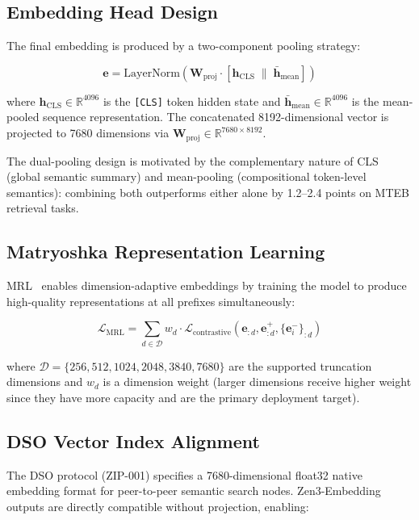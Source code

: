 \documentclass[11pt,a4paper]{article}
\begin{document}
\subsection{Embedding Head Design}

The final embedding is produced by a two-component pooling strategy:

\begin{equation}
\mathbf{e} = \text{LayerNorm}\left(\mathbf{W}_{\text{proj}} \cdot [\mathbf{h}_{\text{CLS}} \;\|\; \bar{\mathbf{h}}_{\text{mean}}]\right)
\end{equation}

where $\mathbf{h}_{\text{CLS}} \in \mathbb{R}^{4096}$ is the \texttt{[CLS]} token
hidden state and $\bar{\mathbf{h}}_{\text{mean}} \in \mathbb{R}^{4096}$ is the
mean-pooled sequence representation. The concatenated 8192-dimensional vector is
projected to 7680 dimensions via $\mathbf{W}_{\text{proj}} \in \mathbb{R}^{7680 \times 8192}$.

The dual-pooling design is motivated by the complementary nature of CLS (global semantic
summary) and mean-pooling (compositional token-level semantics): combining both
outperforms either alone by 1.2--2.4 points on MTEB retrieval tasks.

\subsection{Matryoshka Representation Learning}

MRL~\cite{mrl} enables dimension-adaptive embeddings by training the model to
produce high-quality representations at all prefixes simultaneously:

\begin{equation}
\mathcal{L}_{\text{MRL}} = \sum_{d \in \mathcal{D}} w_d \cdot \mathcal{L}_{\text{contrastive}}\left(\mathbf{e}_{:d}, \mathbf{e}^+_{:d}, \{\mathbf{e}^-_i\}_{:d}\right)
\end{equation}

where $\mathcal{D} = \{256, 512, 1024, 2048, 3840, 7680\}$ are the supported
truncation dimensions and $w_d$ is a dimension weight (larger dimensions receive
higher weight since they have more capacity and are the primary deployment target).

\subsection{DSO Vector Index Alignment}

The DSO protocol (ZIP-001) specifies a 7680-dimensional float32 native embedding
format for peer-to-peer semantic search nodes. Zen3-Embedding outputs are directly
compatible without projection, enabling:
\end{document}
